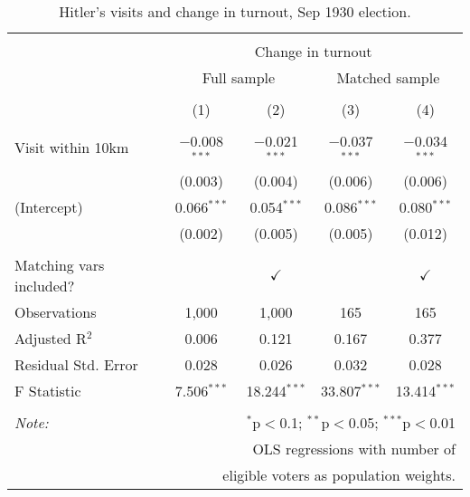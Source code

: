 
\begin{table}[!htbp] \centering 
  \caption{Hitler's visits and change in turnout, Sep 1930 election.} 
  \label{tab:ols-d_p_turnout-1} 
\begin{tabular}{@{\extracolsep{5pt}}lcccc} 
\\[-1.8ex]\hline 
\hline \\[-1.8ex] 
 & \multicolumn{4}{c}{Change in turnout} \\ 
\cline{2-5} 
 & \multicolumn{2}{c}{Full sample} & \multicolumn{2}{c}{Matched sample} \\ 
\\[-1.8ex] & (1) & (2) & (3) & (4)\\ 
\hline \\[-1.8ex] 
 Visit within 10km & $-$0.008$^{***}$ & $-$0.021$^{***}$ & $-$0.037$^{***}$ & $-$0.034$^{***}$ \\ 
  & (0.003) & (0.004) & (0.006) & (0.006) \\ 
  (Intercept) & 0.066$^{***}$ & 0.054$^{***}$ & 0.086$^{***}$ & 0.080$^{***}$ \\ 
  & (0.002) & (0.005) & (0.005) & (0.012) \\ 
 \hline \\[-1.8ex] 
Matching vars included? &  & \multicolumn{1}{c}{$\checkmark$} &  & \multicolumn{1}{c}{$\checkmark$} \\ 
Observations & 1,000 & 1,000 & 165 & 165 \\ 
Adjusted R$^{2}$ & 0.006 & 0.121 & 0.167 & 0.377 \\ 
Residual Std. Error & 0.028 & 0.026 & 0.032 & 0.028 \\ 
F Statistic & 7.506$^{***}$ & 18.244$^{***}$ & 33.807$^{***}$ & 13.414$^{***}$ \\ 
\hline 
\hline \\[-1.8ex] 
\textit{Note:}  & \multicolumn{4}{r}{$^{*}$p$<$0.1; $^{**}$p$<$0.05; $^{***}$p$<$0.01} \\ 
 & \multicolumn{4}{r}{OLS regressions with number of} \\ 
 & \multicolumn{4}{r}{eligible voters as population weights.} \\ 
\end{tabular} 
\end{table} 
